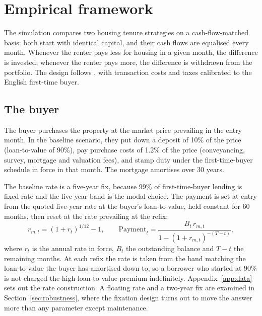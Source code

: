 
\section{Empirical framework}
\label{sec:framework}

The simulation compares two housing tenure strategies on a cash-flow-matched basis: both start with identical capital, and their cash flows are equalised every month. Whenever the renter pays less for housing in a given month, the difference is invested; whenever the renter pays more, the difference is withdrawn from the portfolio. The design follows \textcite{beracha2012}, with transaction costs and taxes calibrated to the English first-time buyer.

\subsection{The buyer}

The buyer purchases the property at the market price prevailing in the entry month. In the baseline scenario, they put down a deposit of 10\% of the price (loan-to-value of 90\%), pay purchase costs of 1.2\% of the price (conveyancing, survey, mortgage and valuation fees), and stamp duty under the first-time-buyer schedule in force in that month. The mortgage amortises over 30 years.

The baseline rate is a five-year fix, because 99\% of first-time-buyer lending is fixed-rate and the five-year band is the modal choice. The payment is set at entry from the quoted five-year rate at the buyer's loan-to-value, held constant for 60 months, then reset at the rate prevailing at the refix:
\begin{equation}
  r_{m,t} = (1 + r_{t})^{1/12} - 1, \qquad
  \text{Payment}_t = \frac{B_t\, r_{m,t}}{1 - (1 + r_{m,t})^{-(T-t)}},
  \label{eq:payment}
\end{equation}
where $r_t$ is the annual rate in force, $B_t$ the outstanding balance and $T-t$ the remaining months. At each refix the rate is taken from the band matching the loan-to-value the buyer has amortised down to, so a borrower who started at 90\% is not charged the high-loan-to-value premium indefinitely. Appendix~\ref{app:data} sets out the rate construction. A floating rate and a two-year fix are examined in Section~\ref{sec:robustness}, where the fixation design turns out to move the answer more than any parameter except maintenance.

